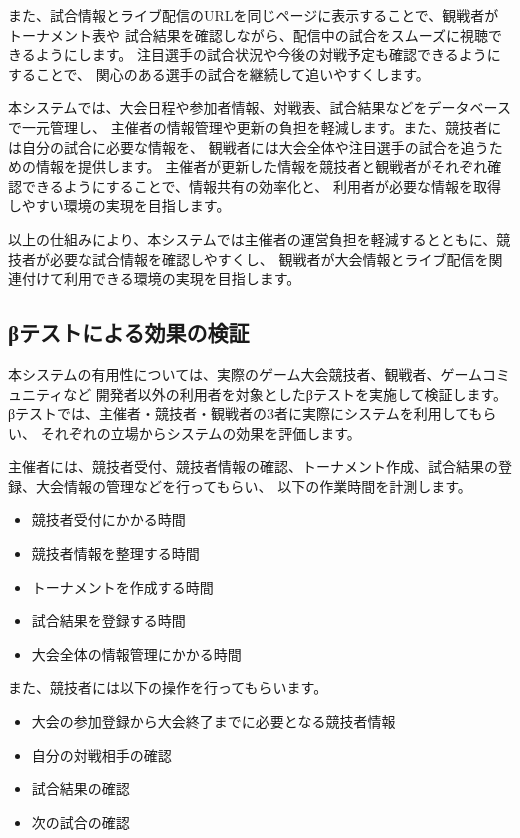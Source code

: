 また、試合情報とライブ配信のURLを同じページに表示することで、観戦者がトーナメント表や
試合結果を確認しながら、配信中の試合をスムーズに視聴できるようにします。
注目選手の試合状況や今後の対戦予定も確認できるようにすることで、
関心のある選手の試合を継続して追いやすくします。

本システムでは、大会日程や参加者情報、対戦表、試合結果などをデータベースで一元管理し、
主催者の情報管理や更新の負担を軽減します。また、競技者には自分の試合に必要な情報を、
観戦者には大会全体や注目選手の試合を追うための情報を提供します。
主催者が更新した情報を競技者と観戦者がそれぞれ確認できるようにすることで、情報共有の効率化と、
利用者が必要な情報を取得しやすい環境の実現を目指します。

以上の仕組みにより、本システムでは主催者の運営負担を軽減するとともに、競技者が必要な試合情報を確認しやすくし、
観戦者が大会情報とライブ配信を関連付けて利用できる環境の実現を目指します。

\subsection{βテストによる効果の検証}

本システムの有用性については、実際のゲーム大会競技者、観戦者、ゲームコミュニティなど
開発者以外の利用者を対象としたβテストを実施して検証します。
βテストでは、主催者・競技者・観戦者の3者に実際にシステムを利用してもらい、
それぞれの立場からシステムの効果を評価します。

主催者には、競技者受付、競技者情報の確認、トーナメント作成、試合結果の登録、大会情報の管理などを行ってもらい、
以下の作業時間を計測します。

\begin{itemize}
  \item 競技者受付にかかる時間
  \item 競技者情報を整理する時間
  \item トーナメントを作成する時間
  \item 試合結果を登録する時間
  \item 大会全体の情報管理にかかる時間
\end{itemize}

また、競技者には以下の操作を行ってもらいます。

\begin{itemize}
  \item 大会の参加登録から大会終了までに必要となる競技者情報
  \item 自分の対戦相手の確認
  \item 試合結果の確認
  \item 次の試合の確認
\end{itemize}

